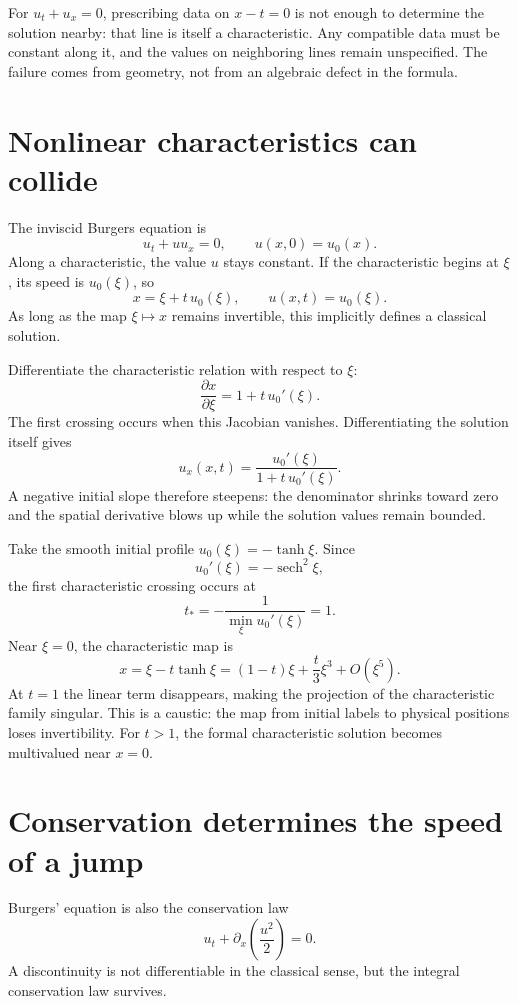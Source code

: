 For \(u_t+u_x=0\), prescribing data on \(x-t=0\) is not enough to determine the solution nearby: that line is itself a characteristic. Any compatible data must be constant along it, and the values on neighboring lines remain unspecified. The failure comes from geometry, not from an algebraic defect in the formula.

\section{Nonlinear characteristics can collide}

The inviscid Burgers equation is
\[
 u_t+uu_x=0,\qquad u(x,0)=u_0(x).
\]
Along a characteristic, the value \(u\) stays constant. If the characteristic begins at \(\xi\), its speed is \(u_0(\xi)\), so
\[
 \boxed{x=\xi+t\,u_0(\xi),\qquad
 u(x,t)=u_0(\xi).}
\]
As long as the map \(\xi\mapsto x\) remains invertible, this implicitly defines a classical solution.

Differentiate the characteristic relation with respect to \(\xi\):
\[
 \frac{\partial x}{\partial\xi}=1+t\,u_0'(\xi).
\]
The first crossing occurs when this Jacobian vanishes. Differentiating the solution itself gives
\[
 \boxed{u_x(x,t)=\frac{u_0'(\xi)}
                          {1+t\,u_0'(\xi)}.}
\]
A negative initial slope therefore steepens: the denominator shrinks toward zero and the spatial derivative blows up while the solution values remain bounded.

Take the smooth initial profile \(u_0(\xi)=-\tanh\xi\). Since
\[
 u_0'(\xi)=-\operatorname{sech}^2\xi,
\]
the first characteristic crossing occurs at
\[
 t_*=-\frac{1}{\min_\xi u_0'(\xi)}=1.
\]
Near \(\xi=0\), the characteristic map is
\[
 x=\xi-t\tanh\xi
   =(1-t)\xi+\frac t3\xi^3+O(\xi^5).
\]
At \(t=1\) the linear term disappears, making the projection of the characteristic family singular. This is a caustic: the map from initial labels to physical positions loses invertibility. For \(t>1\), the formal characteristic solution becomes multivalued near \(x=0\).

\section{Conservation determines the speed of a jump}

Burgers' equation is also the conservation law
\[
 \boxed{u_t+\partial_x\left(\frac{u^2}{2}\right)=0.}
\]
A discontinuity is not differentiable in the classical sense, but the integral conservation law survives.

